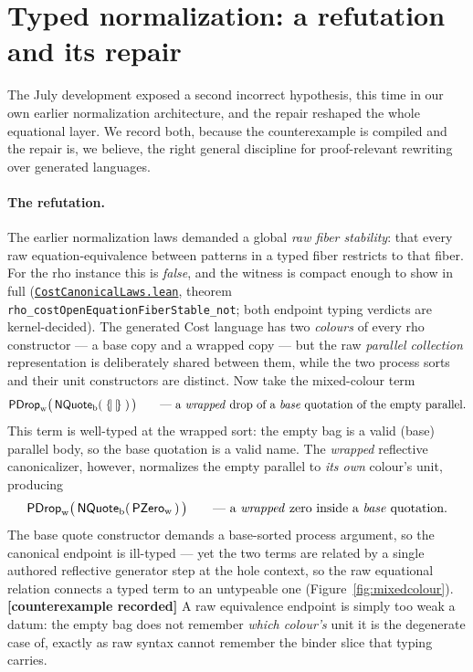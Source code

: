 \documentclass[11pt]{article}
\newcommand{\leanfile}[2]{\href{https://github.com/zariuq/MeTTapedia/blob/main/lean/mettapedia/Mettapedia/#1}{\code{#2}}}
\newcommand{\code}[1]{\texttt{#1}}
\newcommand{\refuted}{\textbf{[counterexample recorded]}}
\begin{document}
\section{Typed normalization: a refutation and its repair}
\label{sec:typednorm}

The July development exposed a second incorrect hypothesis, this time in
our own earlier normalization architecture, and the repair reshaped the
whole equational layer.  We record both, because the counterexample is
compiled and the repair is, we believe, the right general discipline for
proof-relevant rewriting over generated languages.

\paragraph{The refutation.} The earlier normalization laws demanded a
global \emph{raw fiber stability}: that every raw equation-equivalence
between patterns in a typed fiber restricts to that fiber.  For the rho
instance this is \emph{false}, and the witness is compact enough to show
in full
(\leanfile{Languages/ProcessCalculi/RhoCalculus/CostCanonicalLaws.lean}{CostCanonicalLaws.lean},
theorem \code{rho\_costOpenEquationFiberStable\_not}; both endpoint
typing verdicts are kernel-decided).  The generated Cost language has two
\emph{colours} of every rho constructor --- a base copy and a wrapped
copy --- but the raw \emph{parallel collection} representation is
deliberately shared between them, while the two process sorts and their
unit constructors are distinct.  Now take the mixed-colour term
\[
  \mathsf{PDrop}_{\mathrm{w}}\bigl(\,
    \mathsf{NQuote}_{\mathrm{b}}(\;\{\!|\,|\!\}\;)\,\bigr)
  \qquad\text{--- a \emph{wrapped} drop of a \emph{base} quotation of the
  empty parallel.}
\]
This term is well-typed at the wrapped sort: the empty bag is a valid
(base) parallel body, so the base quotation is a valid name.  The
\emph{wrapped} reflective canonicalizer, however, normalizes the empty
parallel to \emph{its own} colour's unit, producing
\[
  \mathsf{PDrop}_{\mathrm{w}}\bigl(\,
    \mathsf{NQuote}_{\mathrm{b}}(\,\mathsf{PZero}_{\mathrm{w}}\,)\,\bigr)
  \qquad\text{--- a \emph{wrapped} zero inside a \emph{base}
  quotation.}
\]
The base quote constructor demands a base-sorted process argument, so the
canonical endpoint is ill-typed --- yet the two terms are related by a
single authored reflective generator step at the hole context, so the raw
equational relation connects a typed term to an untypeable one
(Figure~\ref{fig:mixedcolour}). \refuted{} A raw equivalence endpoint is
simply too weak a datum: the empty bag does not remember \emph{which
colour's} unit it is the degenerate case of, exactly as raw syntax cannot
remember the binder slice that typing carries.
\end{document}
